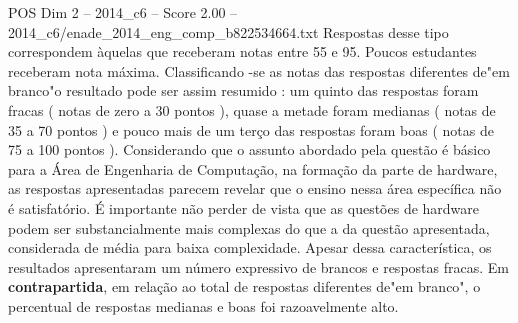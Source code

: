 \begin{textsample}{POS Dim 2 – 2014\_c6 – Score 2.00 – 2014\_c6/enade\_2014\_eng\_comp\_b822534664.txt}
Respostas desse tipo correspondem àquelas que receberam notas entre 55 e 95.
Poucos estudantes receberam nota máxima.
Classificando -se as notas das respostas diferentes de"em branco"o resultado pode ser assim resumido : um quinto das respostas foram fracas ( notas de zero a 30 pontos ), quase a metade foram medianas ( notas de 35 a 70 pontos ) e pouco mais de um terço das respostas foram boas ( notas de 75 a 100 pontos ).
Considerando que o assunto abordado pela questão é básico para a Área de Engenharia de Computação, na formação da parte de hardware, as respostas apresentadas parecem revelar que o ensino nessa área específica não é satisfatório.
É importante não perder de vista que as questões de hardware podem ser substancialmente mais complexas do que a da questão apresentada, considerada de média para baixa complexidade.
Apesar dessa característica, os resultados apresentaram um número expressivo de brancos e respostas fracas.
Em \textbf{contrapartida}, em relação ao total de respostas diferentes de"em branco", o percentual de respostas medianas e boas foi razoavelmente alto.

\end{textsample}
